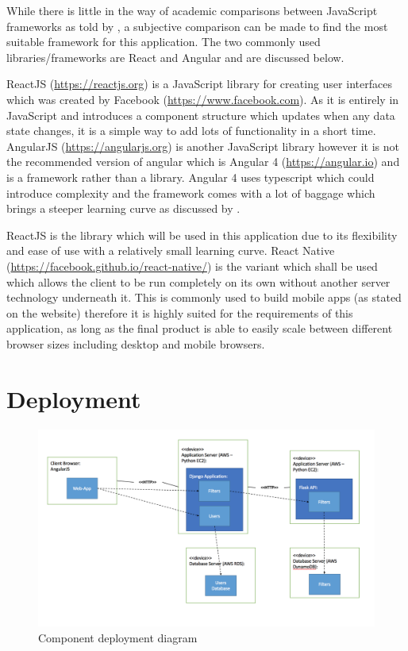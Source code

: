 \documentclass[a4paper,12pt]{report}
\begin{document}
        While there is little in the way of academic comparisons between JavaScript frameworks as told by \cite{graziotin2013making}, a subjective comparison can be made to find the most suitable framework for this application. The two commonly used libraries/frameworks are React and Angular and are discussed below.

        ReactJS (\url{https://reactjs.org}) is a JavaScript library for creating user interfaces which was created by Facebook (\url{https://www.facebook.com}). As it is entirely in JavaScript and introduces a component structure which updates when any data state changes, it is a simple way to add lots of functionality in a short time. AngularJS (\url{https://angularjs.org}) is another JavaScript library however it is not the recommended version of angular which is Angular 4 (\url{https://angular.io}) and is a framework rather than a library. Angular 4 uses typescript which could introduce complexity and the framework comes with a lot of baggage which brings a steeper learning curve as discussed by \cite{neuhaus_2017}.

        ReactJS is the library which will be used in this application due to its flexibility and ease of use with a relatively small learning curve. React Native (\url{https://facebook.github.io/react-native/}) is the variant which shall be used which allows the client to be run completely on its own without another server technology underneath it. This is commonly used to build mobile apps (as stated on the website) therefore it is highly suited for the requirements of this application, as long as the final product is able to easily scale between different browser sizes including desktop and mobile browsers.

    \section{Deployment}

      \begin{figure}[ht]
        \centering
        \includegraphics[width=\linewidth]{deployment-diagram}
        \caption{Component deployment diagram}
        \label{fig:deployment-diagram}
      \end{figure}
\end{document}
